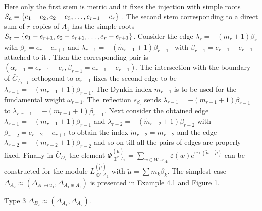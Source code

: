 \documentclass[12pt]{article}
\begin{document}
Here only the first stem is metric and it fixes the injection with
simple roots $S_{\frak{a}}=\left\{ e_{1}-e_{2},e_{2}-e_{3},\ldots
,e_{r-1}-e_{r}\right\} $ . The second stem corresponding to a direct sum of $%
r$ copies of $A_{1}$ has the simple roots $S_{\frak{s}}=\left\{
e_{1}-e_{r+1},e_{2}-e_{r+1},\ldots ,e_{r}-e_{r+1}\right\} $.
Consider the edge $\lambda _{r}=-\left( m_{r}+1\right) \beta _{r}$
with $\beta
_{r}=e_{r}-e_{r+1}$ and $\lambda _{r-1}=-\left( \widetilde{m}%
_{r-1}+1\right) \beta _{r-1}$ \ with $\beta
_{r-1}=e_{r-1}-e_{r+1}$ attached to it . Then the corresponding
pair is $\left( \alpha _{r-1}=e_{r-1}-e_{r},\beta
_{r-1}=e_{r-1}-e_{r+1}\right).$ The intersection with the
boundary of $\bar{C}_{A_{r-1}}$ orthogonal to $\alpha _{r-1}$
fixes the second edge to be $\lambda _{r-1}=-\left(
m_{r-1}+1\right) \beta _{r-1}$. The Dynkin index $m_{r-1}$ is to
be used for the fundamental weight  $\omega _{r-1}.$ The\
reflection $s_{\beta _{r}}$ sends $\lambda _{r-1}=-\left(
m_{r-1}+1\right) \beta _{r-1}$ to $\lambda _{r,r-1}=-\left(
m_{r-1}+1\right) \beta _{r-1}.$ Next consider the obtained edge
$\lambda _{r-1}=-\left( m_{r-1}+1\right) \beta _{r-1}$ and
$\lambda _{r-2}=-\left( \widetilde{m}_{r-2}+1\right) \beta _{r-2}$
with $\beta _{r-2}=e_{r-2}-e_{r+1} $ to obtain the index
$\widetilde{m}_{r-2}=m_{r-2}$ and the edge $\lambda _{r-2}=-\left(
m_{r-2}+1\right) \beta _{r-2}$ and so on till all the pairs of
edges are properly fixed. Finally in $\bar{C}_{D_{r}}$ the element
$\Phi _{\oplus ^{r}A_{1}}^{\left( \widetilde{\mu }\right)
}=\sum_{w\in W_{\oplus
^{r}A_{1}}}\varepsilon \left( w\right) e^{w\circ \left( \widetilde{\mu }+%
\widetilde{\rho }\right) }$ can be constructed for the module
$L_{\oplus ^{r}A_{1}}^{\left( \widetilde{\mu }\right) }$ with
$\widetilde{\mu }=\sum m_{k}\beta _{k}.$ The simplest case
$\Delta _{A_{2}}\approx (\Delta _{A_{1}\oplus u_{1}},\Delta
_{A_{1}\oplus A_{1}})$ is presented in Example 4.1 and Figure 1.

Type 3 $\Delta _{B_{2}}\approx (\Delta _{A_{1}},\Delta _{A_{2}}).$
\end{document}
